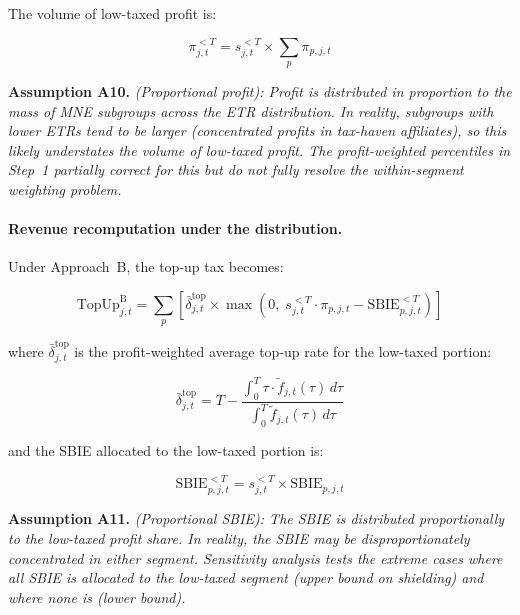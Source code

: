 \documentclass[11pt,a4paper]{article}
\newcommand{\assumption}[2]{\noindent\textbf{Assumption #1.} \textit{#2}\medskip}
\begin{document}
The volume of low-taxed profit is:

\begin{equation}\label{eq:lowtax_profit}
\pi_{j,t}^{<T} = s_{j,t}^{<T} \times \sum_p \pi_{p,j,t}
\end{equation}

\assumption{A10}{(Proportional profit): Profit is distributed in proportion to the mass of MNE subgroups across the ETR distribution. In reality, subgroups with lower ETRs tend to be larger (concentrated profits in tax-haven affiliates), so this likely \emph{understates} the volume of low-taxed profit. The profit-weighted percentiles in Step~1 partially correct for this but do not fully resolve the within-segment weighting problem.}

\paragraph{Revenue recomputation under the distribution.}
Under Approach~B, the top-up tax becomes:

\begin{equation}\label{eq:topup_distrib}
\text{TopUp}_{j,t}^{\text{B}} = \sum_p \left[\bar{\delta}_{j,t}^{\text{top}} \times \max\!\left(0,\; s_{j,t}^{<T} \cdot \pi_{p,j,t} - \text{SBIE}_{p,j,t}^{<T}\right)\right]
\end{equation}

where $\bar{\delta}_{j,t}^{\text{top}}$ is the profit-weighted average top-up rate for the low-taxed portion:

\begin{equation}\label{eq:avg_topup_rate}
\bar{\delta}_{j,t}^{\text{top}} = T - \frac{\int_0^{T} \tau \cdot \tilde{f}_{j,t}(\tau) \, d\tau}{\int_0^{T} \tilde{f}_{j,t}(\tau) \, d\tau}
\end{equation}

and the SBIE allocated to the low-taxed portion is:

\begin{equation}\label{eq:sbie_lowtax}
\text{SBIE}_{p,j,t}^{<T} = s_{j,t}^{<T} \times \text{SBIE}_{p,j,t}
\end{equation}

\assumption{A11}{(Proportional SBIE): The SBIE is distributed proportionally to the low-taxed profit share. In reality, the SBIE may be disproportionately concentrated in either segment. Sensitivity analysis tests the extreme cases where all SBIE is allocated to the low-taxed segment (upper bound on shielding) and where none is (lower bound).}
\end{document}
